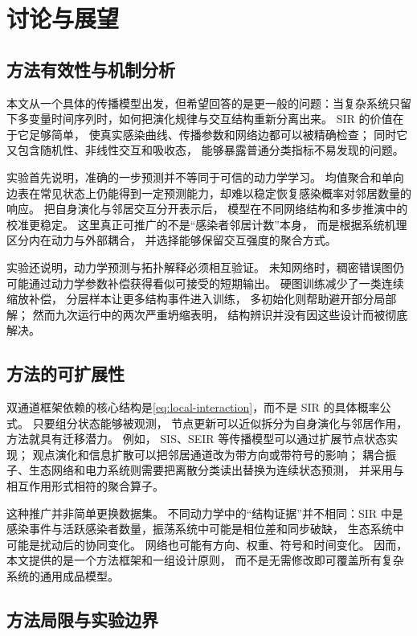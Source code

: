 \section{讨论与展望}

\subsection{方法有效性与机制分析}

本文从一个具体的传播模型出发，但希望回答的是更一般的问题：当复杂系统只留下多变量时间序列时，如何把演化规律与交互结构重新分离出来。
SIR 的价值在于它足够简单，
使真实感染曲线、传播参数和网络边都可以被精确检查；
同时它又包含随机性、非线性交互和吸收态，
能够暴露普通分类指标不易发现的问题。

实验首先说明，准确的一步预测并不等同于可信的动力学学习。
均值聚合和单向边表在常见状态上仍能得到一定预测能力，却难以稳定恢复感染概率对邻居数量的响应。
把自身演化与邻居交互分开表示后，
模型在不同网络结构和多步推演中的校准更稳定。
这里真正可推广的不是“感染者邻居计数”本身，
而是根据系统机理区分内在动力与外部耦合，
并选择能够保留交互强度的聚合方式。

实验还说明，动力学预测与拓扑解释必须相互验证。
未知网络时，稠密错误图仍可能通过动力学参数补偿获得看似可接受的短期输出。
硬图训练减少了一类连续缩放补偿，
分层样本让更多结构事件进入训练，
多初始化则帮助避开部分局部解；
然而九次运行中的两次严重坍缩表明，
结构辨识并没有因这些设计而被彻底解决。

\subsection{方法的可扩展性}

双通道框架依赖的核心结构是\cref{eq:local-interaction}，而不是 SIR 的具体概率公式。
只要组分状态能够被观测，
节点更新可以近似拆分为自身演化与邻居作用，
方法就具有迁移潜力。
例如，
SIS、SEIR 等传播模型可以通过扩展节点状态实现；
观点演化和信息扩散可以把邻居通道改为带方向或带符号的影响；
耦合振子、生态网络和电力系统则需要把离散分类读出替换为连续状态预测，
并采用与相互作用形式相符的聚合算子。

这种推广并非简单更换数据集。
不同动力学中的“结构证据”并不相同：SIR 中是感染事件与活跃感染者数量，振荡系统中可能是相位差和同步破缺，
生态系统中可能是扰动后的协同变化。
网络也可能有方向、权重、符号和时间变化。
因而，
本文提供的是一个方法框架和一组设计原则，
而不是无需修改即可覆盖所有复杂系统的通用成品模型。

\subsection{方法局限与实验边界}

